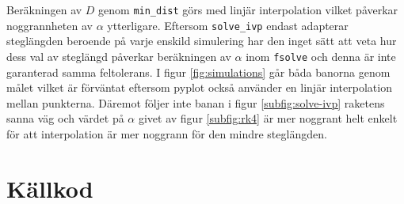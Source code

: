 \documentclass{article}
\begin{document}
Beräkningen av \(D\) genom \texttt{min\_dist} görs med linjär interpolation vilket påverkar noggrannheten av \(\alpha\) ytterligare. Eftersom \texttt{solve\_ivp} endast adapterar steglängden beroende på varje enskild simulering har den inget sätt att veta hur dess val av steglängd påverkar beräkningen av \(\alpha\) inom \texttt{fsolve} och denna är inte garanterad samma feltolerans. I figur \ref{fig:simulations} går båda banorna genom målet vilket är förväntat eftersom pyplot också använder en linjär interpolation mellan punkterna. Däremot följer inte banan i figur \ref{subfig:solve-ivp} raketens sanna väg och värdet på \(\alpha\) givet av figur \ref{subfig:rk4} är mer noggrant helt enkelt för att interpolation är mer noggrann för den mindre steglängden.

\appendix
\clearpage
\section{Källkod}
\inputminted{python3}{main.py}
\end{document}
